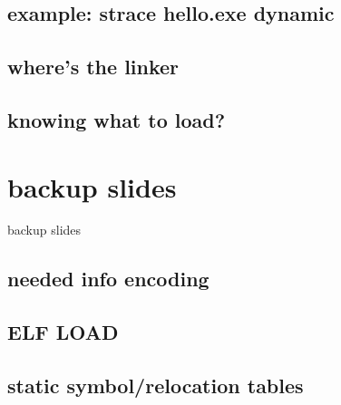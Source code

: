 \subsection{example: strace hello.exe dynamic}


\subsection{where's the linker}


\subsection{knowing what to load?}


\section{backup slides}
\begin{frame}{backup slides}
\end{frame}

\subsection{needed info encoding}


\subsection{ELF LOAD}


\subsection{static symbol/relocation tables}



